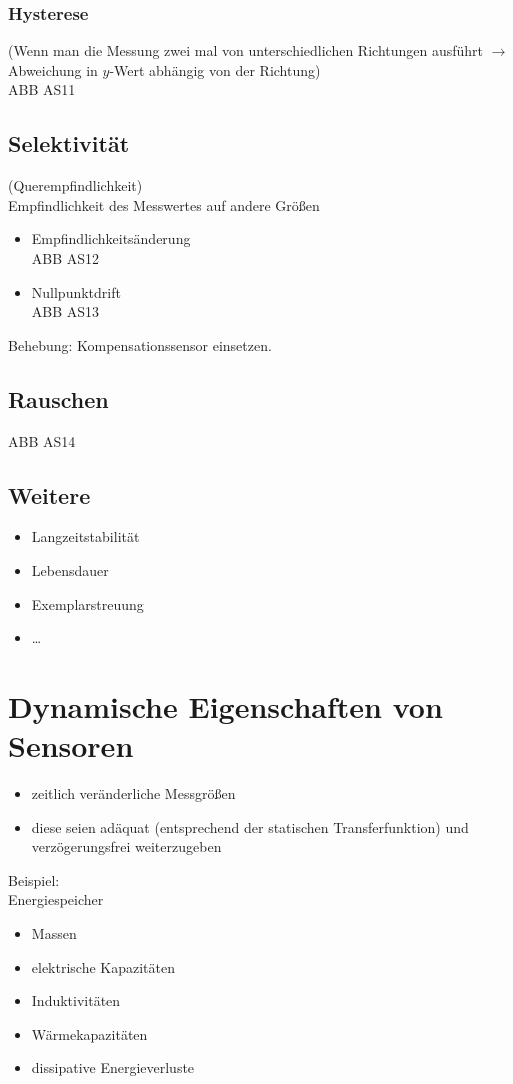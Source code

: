 \subsubsection{Hysterese}
(Wenn man die Messung zwei mal von unterschiedlichen Richtungen ausführt $\to$ Abweichung in $y$-Wert abhängig von der Richtung)\\
ABB AS11

\subsection{Selektivität}
(Querempfindlichkeit)\\
Empfindlichkeit des Messwertes auf andere Größen
\begin{itemize}
\item Empfindlichkeitsänderung\\
ABB AS12
\item Nullpunktdrift\\
ABB AS13
\end{itemize}
Behebung: Kompensationssensor einsetzen.

\subsection{Rauschen}
ABB AS14

\subsection{Weitere}
\begin{itemize}
\item Langzeitstabilität
\item Lebensdauer
\item Exemplarstreuung
\item …
\end{itemize}

\section{Dynamische Eigenschaften von Sensoren}
\begin{itemize}
\item zeitlich veränderliche Messgrößen
\item diese seien adäquat (entsprechend der statischen Transferfunktion) und verzögerungsfrei weiterzugeben
\end{itemize}
Beispiel:\\
Energiespeicher
\begin{itemize}
\item Massen
\item elektrische Kapazitäten
\item Induktivitäten
\item Wärmekapazitäten
\item dissipative Energieverluste
\end{itemize}

